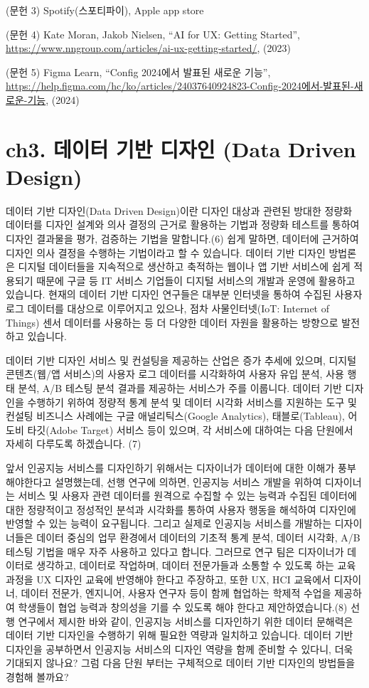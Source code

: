 \documentclass[
  letterpaper,
]{book}
\begin{document}
(문헌 3) Spotify(스포티파이), Apple app store

(문헌 4) Kate Moran, Jakob Nielsen, ``AI for UX: Getting Started'',
\url{https://www.nngroup.com/articles/ai-ux-getting-started/}, (2023)

(문헌 5) Figma Learn, ``Config 2024에서 발표된 새로운 기능'',
\url{https://help.figma.com/hc/ko/articles/24037640924823-Config-2024에서-발표된-새로운-기능},
(2024)

\chapter{ch3. 데이터 기반 디자인 (Data Driven
Design)}\label{ch3.-uxb370uxc774uxd130-uxae30uxbc18-uxb514uxc790uxc778-data-driven-design}

데이터 기반 디자인(Data Driven Design)이란 디자인 대상과 관련된 방대한
정량화 데이터를 디자인 설계와 의사 결정의 근거로 활용하는 기법과 정량화
테스트를 통하여 디자인 결과물을 평가, 검증하는 기법을 말합니다.(6) 쉽게
말하면, 데이터에 근거하여 디자인 의사 결정을 수행하는 기법이라고 할 수
있습니다. 데이터 기반 디자인 방법론은 디지털 데이터들을 지속적으로
생산하고 축적하는 웹이나 앱 기반 서비스에 쉽게 적용되기 때문에 구글 등
IT 서비스 기업들이 디지털 서비스의 개발과 운영에 활용하고 있습니다.
현재의 데이터 기반 디자인 연구들은 대부분 인터넷을 통하여 수집된 사용자
로그 데이터를 대상으로 이루어지고 있으나, 점차 사물인터넷(IoT: Internet
of Things) 센서 데이터를 사용하는 등 더 다양한 데이터 자원을 활용하는
방향으로 발전하고 있습니다.

데이터 기반 디자인 서비스 및 컨설팅을 제공하는 산업은 증가 추세에
있으며, 디지털 콘텐츠(웹/앱 서비스)의 사용자 로그 데이터를 시각화하여
사용자 유입 분석, 사용 행태 분석, A/B 테스팅 분석 결과를 제공하는
서비스가 주를 이룹니다. 데이터 기반 디자인을 수행하기 위하여 정량적 통계
분석 및 데이터 시각화 서비스를 지원하는 도구 및 컨설팅 비즈니스 사례에는
구글 애널리틱스(Google Analytics), 태블로(Tableau), 어도비 타깃(Adobe
Target) 서비스 등이 있으며, 각 서비스에 대하여는 다음 단원에서 자세히
다루도록 하겠습니다. (7)

앞서 인공지능 서비스를 디자인하기 위해서는 디자이너가 데이터에 대한
이해가 풍부해야한다고 설명했는데, 선행 연구에 의하면, 인공지능 서비스
개발을 위하여 디자이너는 서비스 및 사용자 관련 데이터를 원격으로 수집할
수 있는 능력과 수집된 데이터에 대한 정량적이고 정성적인 분석과 시각화를
통하여 사용자 행동을 해석하여 디자인에 반영할 수 있는 능력이 요구됩니다.
그리고 실제로 인공지능 서비스를 개발하는 디자이너들은 데이터 중심의 업무
환경에서 데이터의 기초적 통계 분석, 데이터 시각화, A/B 테스팅 기법을
매우 자주 사용하고 있다고 합니다. 그러므로 연구 팀은 디자이너가 데이터로
생각하고, 데이터로 작업하며, 데이터 전문가들과 소통할 수 있도록 하는
교육 과정을 UX 디자인 교육에 반영해야 한다고 주장하고, 또한 UX, HCI
교육에서 디자이너, 데이터 전문가, 엔지니어, 사용자 연구자 등이 함께
협업하는 학제적 수업을 제공하여 학생들이 협업 능력과 창의성을 기를 수
있도록 해야 한다고 제안하였습니다.(8) 선행 연구에서 제시한 바와 같이,
인공지능 서비스를 디자인하기 위한 데이터 문해력은 데이터 기반 디자인을
수행하기 위해 필요한 역량과 일치하고 있습니다. 데이터 기반 디자인을
공부하면서 인공지능 서비스의 디자인 역량을 함께 준비할 수 있다니, 더욱
기대되지 않나요? 그럼 다음 단원 부터는 구체적으로 데이터 기반 디자인의
방법들을 경험해 볼까요?
\end{document}
